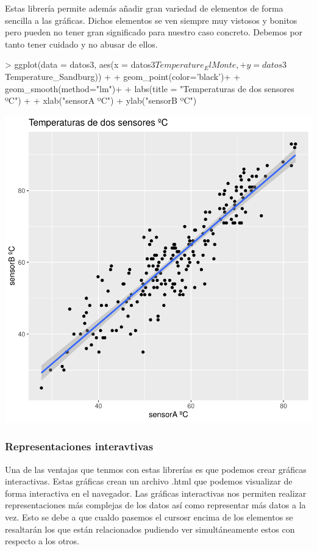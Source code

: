 \documentclass [a4paper] {article}
\begin{document}
Estas librería permite además añadir gran variedad de elementos de forma sencilla a las gráficas.
Dichos elementos se ven siempre muy vistosos y bonitos pero pueden no tener gran significado para nuestro caso concreto.
Debemos por tanto tener cuidado y no abusar de ellos.
\begin{center}
\begin{Schunk}
\begin{Sinput}
> ggplot(data = datos3, aes(x = datos3$Temperature_ElMonte, 
+                           y = datos3$Temperature_Sandburg)) + 
+   geom_point(color='black')+
+   geom_smooth(method="lm")+ 
+   labs(title = "Temperaturas de dos sensores ºC") +
+   xlab("sensorA ºC") + ylab("sensorB ºC")
\end{Sinput}
\end{Schunk}
\includegraphics{entrega-ggplot2_se}
\end{center}

\subsubsection{Representaciones interavtivas}
Una de las ventajas que tenmos con estas librerías es que podemos crear gráficas interactivas.
Estas gráficas crean un archivo .html que podemos visualizar de forma interactiva en el navegador.
Las gráficas interactivas nos permiten realizar representaciones más complejas de los datos así como representar más datos a la vez.
Esto se debe a que cualdo pasemos el cursosr encima de los elementos se resaltarán los que están relacionados pudiendo ver simultáneamente estos con respecto a los otros.
\end{document}
